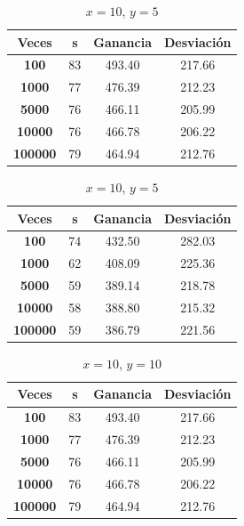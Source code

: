 \documentclass[11pt,a4paper]{report}
\begin{document}
\begin{table}[H]
	\parbox{.45\linewidth}{
	\centering
	\begin{tabular}{c|ccc}
	\textbf{Veces} & \textbf{s} & \textbf{Ganancia} & \textbf{Desviación} \\ \hline
	\textbf{100}   & 83         & 493.40            & 217.66			  \\ \hline
	\textbf{1000}  & 77         & 476.39            & 212.23			  \\ \hline
	\textbf{5000}  & 76         & 466.11            & 205.99 			  \\ \hline
	\textbf{10000} & 76         & 466.78            & 206.22			  \\ \hline
	\textbf{100000}& 79         & 464.94            & 212.76			  \\
	\end{tabular}
	\caption{$x=10$, $y=1$}
	}
	\hfill
	\parbox{.45\linewidth}{
	\centering
	\begin{tabular}{c|ccc}
	\textbf{Veces} & \textbf{s} & \textbf{Ganancia} & \textbf{Desviación} \\ \hline
	\textbf{100}   & 74         & 432.50            & 282.03			  \\ \hline
	\textbf{1000}  & 62         & 408.09            & 225.36			  \\ \hline
	\textbf{5000}  & 59         & 389.14            & 218.78 			  \\ \hline
	\textbf{10000} & 58         & 388.80            & 215.32			  \\ \hline
	\textbf{100000}& 59         & 386.79            & 221.56 			  \\
	\end{tabular}
	\caption{$x=10$, $y=5$}
	}
\end{table}
\begin{table}[H]
	\centering
	\begin{tabular}{c|ccc}
	\textbf{Veces} & \textbf{s} & \textbf{Ganancia} & \textbf{Desviación} \\ \hline
	\textbf{100}   & 83         & 493.40            & 217.66			  \\ \hline
	\textbf{1000}  & 77         & 476.39            & 212.23			  \\ \hline
	\textbf{5000}  & 76         & 466.11            & 205.99 			  \\ \hline
	\textbf{10000} & 76         & 466.78            & 206.22			  \\ \hline
	\textbf{100000}& 79         & 464.94            & 212.76			  \\
	\end{tabular}
	\caption{$x=10$, $y=10$}
\end{table}
\end{document}
